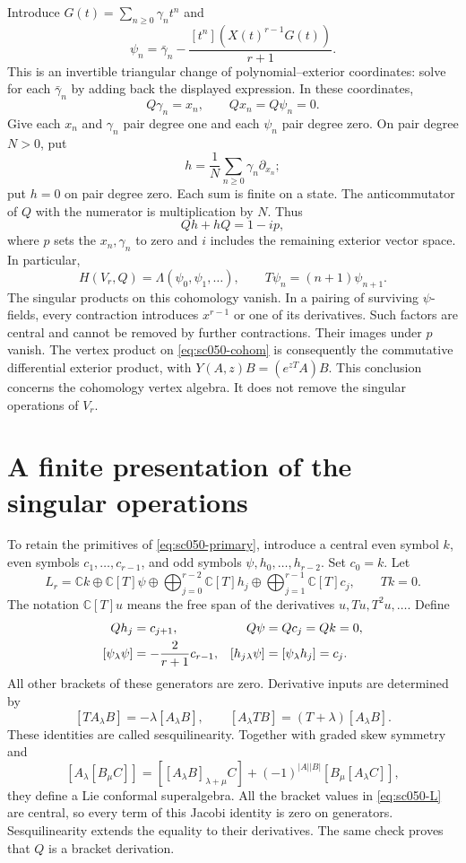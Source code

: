 Introduce \(G(t)=\sum_{n\ge0}\gamma_nt^n\) and
\[
 \psi_n=\bar\gamma_n-\frac{[t^n](X(t)^{r-1}G(t))}{r+1}.
\]
This is an invertible triangular change of polynomial--exterior
coordinates: solve for each \(\bar\gamma_n\) by adding back the
displayed expression. In these coordinates,
\[
 Q\gamma_n=x_n,\qquad Qx_n=Q\psi_n=0.
\]
Give each \(x_n\) and \(\gamma_n\) pair degree one and each \(\psi_n\)
pair degree zero. On pair degree \(N>0\), put
\[
 h=\frac1N\sum_{n\ge0}\gamma_n\partial_{x_n};
\]
put \(h=0\) on pair degree zero. Each sum is finite on a state.
The anticommutator of \(Q\) with the numerator is multiplication by
\(N\). Thus
\[
 Qh+hQ=1-ip,
\]
where \(p\) sets the \(x_n,\gamma_n\) to zero and \(i\) includes the
remaining exterior vector space. In particular,
\begin{equation}\label{eq:sc050-cohom}
 H(V_r,Q)=\Lambda(\psi_0,\psi_1,\ldots),\qquad
 T\psi_n=(n+1)\psi_{n+1}.
\end{equation}
The singular products on this cohomology vanish. In a pairing of
surviving \(\psi\)-fields, every contraction introduces \(x^{r-1}\)
or one of its derivatives. Such factors are central and cannot be
removed by further contractions. Their images under \(p\) vanish.
The vertex product on \eqref{eq:sc050-cohom} is consequently the
commutative differential exterior product, with
\(Y(A,z)B=(e^{zT}A)B\). This conclusion concerns the cohomology
vertex algebra. It does not remove the singular operations of \(V_r\).

\section{A finite presentation of the singular operations}
\label{sec:sc050-presentation}

To retain the primitives of \eqref{eq:sc050-primary}, introduce a
central even symbol \(k\), even symbols \(c_1,\ldots,c_{r-1}\), and
odd symbols \(\psi,h_0,\ldots,h_{r-2}\). Set \(c_0=k\).
Let
\[
 L_r=\mathbb Ck\oplus\mathbb C[T]\psi
 \oplus\bigoplus_{j=0}^{r-2}\mathbb C[T]h_j
 \oplus\bigoplus_{j=1}^{r-1}\mathbb C[T]c_j,\qquad Tk=0.
\]
The notation \(\mathbb C[T]u\) means the free span of the derivatives
\(u,Tu,T^2u,\ldots\). Define
\begin{align}
 Qh_j&=c_{j+1},&Q\psi&=Qc_j=Qk=0,\notag\\
 [\psi_\lambda\psi]&=-\frac2{r+1}c_{r-1},&
 [h_j{}_\lambda\psi]&=[\psi_\lambda h_j]=c_j.
 \label{eq:sc050-L}
\end{align}
All other brackets of these generators are zero. Derivative inputs
are determined by
\[
 [TA_\lambda B]=-\lambda[A_\lambda B],\qquad
 [A_\lambda TB]=(T+\lambda)[A_\lambda B].
\]
These identities are called sesquilinearity. Together with graded
skew symmetry and
\[
 [A_\lambda[B_\mu C]]
 =[[A_\lambda B]_{\lambda+\mu}C]
   +(-1)^{|A||B|}[B_\mu[A_\lambda C]],
\]
they define a Lie conformal superalgebra. All the bracket values in
\eqref{eq:sc050-L} are central, so every term of this Jacobi identity
is zero on generators. Sesquilinearity extends the equality to their
derivatives. The same check proves that \(Q\) is a bracket derivation.

